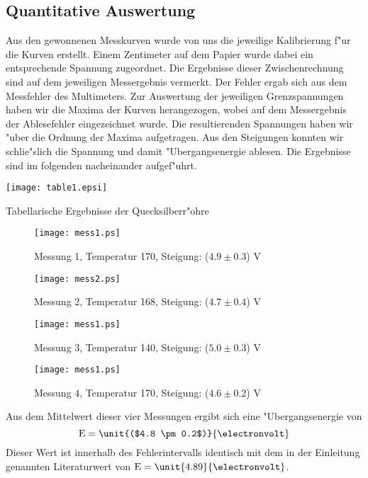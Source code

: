 \documentclass[a4paper,10pt]{article}
\begin{document}
\subsection{Quantitative Auswertung}
Aus den gewonnenen Messkurven wurde von uns die jeweilige Kalibrierung f"ur die Kurven erstellt. Einem Zentimeter auf dem Papier wurde dabei ein entsprechende Spannung zugeordnet. Die Ergebnisse dieser Zwischenrechnung sind auf dem jeweiligen Messergebnis vermerkt. Der Fehler ergab sich aus dem Messfehler des Multimeters. Zur Auswertung der jeweiligen Grenzspannungen haben wir die Maxima der Kurven herangezogen, wobei auf dem Messergebnis der Ablesefehler eingezeichnet wurde. Die resultierenden Spannungen haben wir "uber die Ordnung der Maxima aufgetragen. Aus den Steigungen konnten wir schlie"slich die Spannung und damit "Ubergangsenergie ablesen. Die Ergebnisse sind im folgenden nacheinander aufgef"uhrt.
\begin{table}[ht]
	\centering
	\texttt{[image: table1.epsi]}
	\caption{Tabellarische Ergebnisse der Quecksilberr"ohre}
	\label{table1}
\end{table}
\begin{figure}[ht]
	\centering
	\texttt{[image: mess1.ps]}
	\caption{ Messung 1, Temperatur \unit{170}{\celsius}, Steigung: ($4.9 \pm 0.3$) V}
	\label{mess1}
\end{figure}
\begin{figure}[ht]
	\centering
	\texttt{[image: mess2.ps]}
	\caption{ Messung 2, Temperatur \unit{168}{\celsius}, Steigung: ($4.7 \pm 0.4$) V}
	\label{mess2}
\end{figure}
\begin{figure}[ht]
	\centering
	\texttt{[image: mess1.ps]}
	\caption{ Messung 3, Temperatur \unit{140}{\celsius}, Steigung: ($5.0 \pm 0.3$) V}
	\label{mess3}
\end{figure}
\begin{figure}[ht]
	\centering
	\texttt{[image: mess1.ps]}
	\caption{ Messung 4, Temperatur \unit{170}{\celsius}, Steigung: ($4.6 \pm 0.2$) V}
	\label{mess4}
\end{figure}
\clearpage
Aus dem Mittelwert dieser vier Messungen ergibt sich eine "Ubergangsenergie von 
$$
\text{E}=\unit{($4.8 \pm 0.2$)}{\electronvolt}
$$
Dieser Wert ist innerhalb des Fehlerintervalls identisch mit dem in der Einleitung genannten Literaturwert von $\text{E}=\unit{4.89}{\electronvolt}$.
\end{document}
